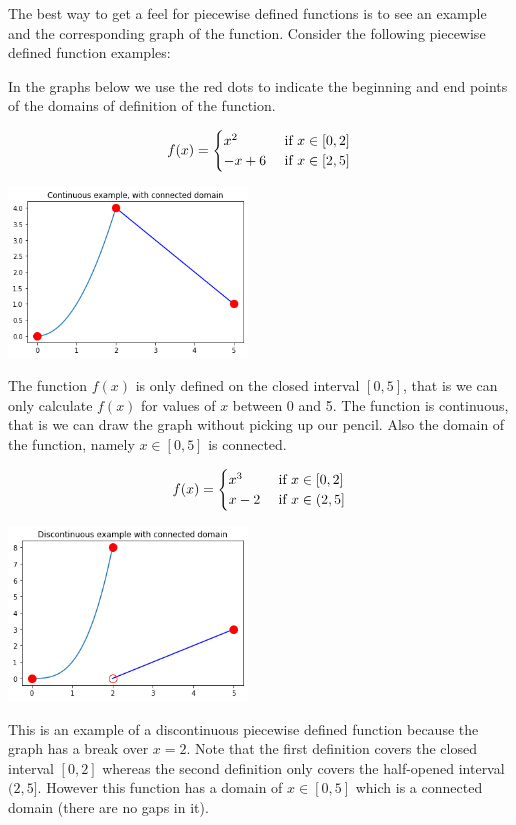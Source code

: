 \documentclass[10pt]{article}
\begin{document}
The best way to get a feel for piecewise defined functions is to see an
example and the corresponding graph of the function.
Consider the following piecewise defined function examples:
\begin{note}
In the graphs below we use the red dots to indicate the beginning
and end points of the domains of definition of the function.
\end{note}
\begin{example}
\label{ex:1}
$$
f(x) =
\begin{cases}
x^2 & \hbox{ if } x\in [0,2] \\
-x+6 & \hbox{ if } x \in [2, 5]
\end{cases}
$$
\begin{center}
\includegraphics[width=2.5in]{graph1}
\end{center}
The function $f(x)$ is only defined on the closed interval $[0, 5]$, that is
we can only calculate $f(x)$ for values of $x$ between 0 and 5.  The function
is continuous, that is we can draw the graph without picking up our pencil.
Also the domain of the function, namely $x \in [0,5]$ is connected.
\end{example}
\begin{example}
\label{ex:2}
$$
f(x) =
\begin{cases}
x^3 & \hbox{ if } x\in [0,2] \\
x-2 & \hbox{ if } x \in (2, 5]
\end{cases}
$$
\begin{center}
\includegraphics[width=2.5in]{graph2}
\end{center}
This is an example of a discontinuous piecewise defined function because the
graph has a break over $x=2$.  Note that the first definition covers the
closed interval $[0,2]$ whereas the second definition only covers the
half-opened interval $(2,5]$.  However this function has a domain of
$x \in [0, 5]$ which is a connected domain (there are no gaps in it).
\end{example}
\end{document}
